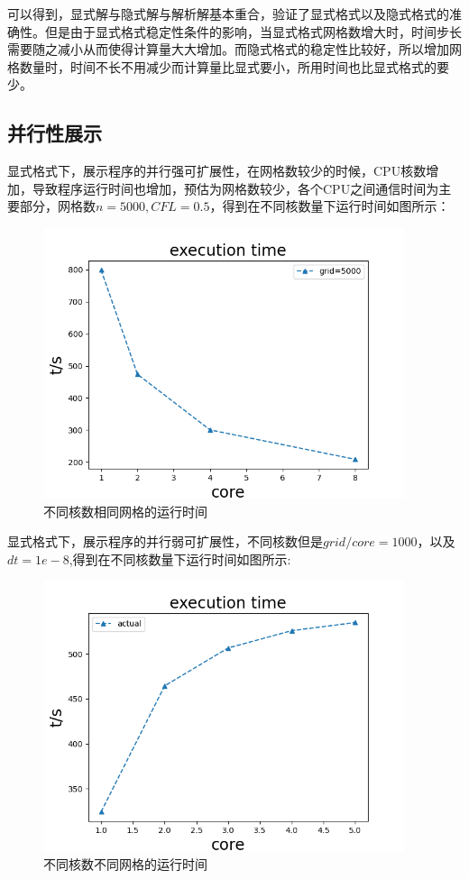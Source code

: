 \documentclass[
	20pt%
]{SUSTechHomework}
\begin{document}
\qquad 可以得到，显式解与隐式解与解析解基本重合，验证了显式格式以及隐式格式的准确性。但是由于显式格式稳定性条件的影响，当显式格式网格数增大时，时间步长需要随之减小从而使得计算量大大增加。而隐式格式的稳定性比较好，所以增加网格数量时，时间不长不用减少而计算量比显式要小，所用时间也比显式格式的要少。
\clearpage
\subsection{并行性展示}
\qquad  显式格式下，展示程序的并行强可扩展性，在网格数较少的时候，CPU核数增加，导致程序运行时间也增加，预估为网格数较少，各个CPU之间通信时间为主要部分，网格数$n=5000,CFL=0.5$，得到在不同核数量下运行时间如图所示：
\begin{figure}[h]
    \centering
    \includegraphics[width=300pt]{img/execution time.png}
    \caption{不同核数相同网格的运行时间}
    \label{fig:my_label}
\end{figure}

\qquad 显式格式下，展示程序的并行弱可扩展性，不同核数但是$grid/core=1000$，以及$dt=1e-8$,得到在不同核数量下运行时间如图所示:
\begin{figure}[h]
    \centering
    \includegraphics[width=300pt]{img/execution.png}
    \caption{不同核数不同网格的运行时间}
    \label{fig:my_label}
\end{figure}
\end{document}
